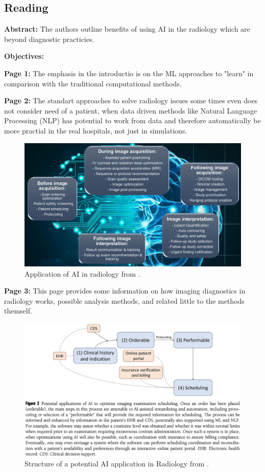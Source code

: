 \subsection{Reading}
    \textbf{Abstract:}
    The authors outline benefits of using AI in the radiology which are beyond diagnostic practicies.
    
    \textbf{Objectives:}

    
    \textbf{Page 1:}
    The emphasis in the introductio is on the ML approaches to "learn" in comparison with the traditional computational methods.
    
    \textbf{Page 2:}
    The standart approaches to solve radiology issues some times even does not consider need of a patient, when data driven methods like Natural Language Processing (NLP) has potential to work from data and therefore automatically be more practial in the real hospitals, not just in simulations.
    \begin{figure}[H]
        \centering
        \includegraphics[width=1\textwidth]{figures/0012_SR03US23/fig1.png}
        \caption{Application of AI in radiology from \cite{x076}.}
        \label{fig1:0012_SR03US23}
    \end{figure}

    \textbf{Page 3:}
    This page provides some information on how imaging diagnostics in radiology works, possible analysis methods, and related little to the methods themself.
    \begin{figure}[H]
        \centering
        \includegraphics[width=1\textwidth]{figures/0012_SR03US23/fig2.png}
        \caption{Structure of a potential AI application in Radiology from \cite{x076}.}
        \label{fig2:0012_SR03US23}
    \end{figure}

